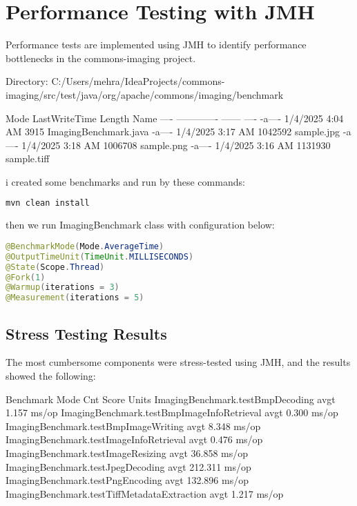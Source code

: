 \documentclass[a4paper,12pt]{report}
\begin{document}
\chapter{Performance Testing with JMH}
Performance tests are implemented using JMH to identify performance bottlenecks in the commons-imaging project.

 Directory: C:/Users/mehra/IdeaProjects/commons-imaging/src/test/java/org/apache/commons/imaging/benchmark


Mode                 LastWriteTime         Length Name
----                 -------------         ------ ----
-a----          1/4/2025   4:04 AM           3915 ImagingBenchmark.java
-a----          1/4/2025   3:17 AM        1042592 sample.jpg
-a----          1/4/2025   3:18 AM        1006708 sample.png
-a----          1/4/2025   3:16 AM        1131930 sample.tiff

i created some benchmarks and run by these commands:
\begin{lstlisting}[language=bash]
mvn clean install
\end{lstlisting}
then
we run ImagingBenchmark class with configuration below:

\begin{lstlisting}[language=java, caption=ImagingBenchmark-configuration]
@BenchmarkMode(Mode.AverageTime)
@OutputTimeUnit(TimeUnit.MILLISECONDS)
@State(Scope.Thread)
@Fork(1)
@Warmup(iterations = 3)
@Measurement(iterations = 5)
\end{lstlisting}

\section{Stress Testing Results}
The most cumbersome components were stress-tested using JMH, and the results showed the following:

Benchmark                                    Mode  Cnt    Score   Units
ImagingBenchmark.testBmpDecoding             avgt         1.157          ms/op
ImagingBenchmark.testBmpImageInfoRetrieval   avgt         0.300          ms/op
ImagingBenchmark.testBmpImageWriting         avgt         8.348          ms/op
ImagingBenchmark.testImageInfoRetrieval      avgt         0.476          ms/op
ImagingBenchmark.testImageResizing           avgt        36.858          ms/op
ImagingBenchmark.testJpegDecoding            avgt       212.311          ms/op
ImagingBenchmark.testPngEncoding             avgt       132.896          ms/op
ImagingBenchmark.testTiffMetadataExtraction  avgt         1.217          ms/op
\end{document}
